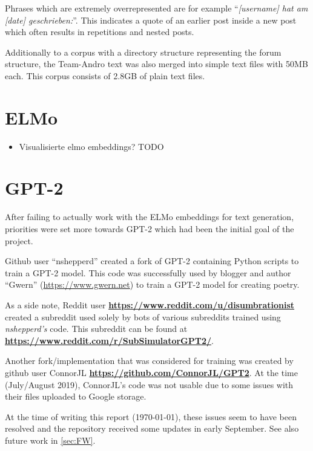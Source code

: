 \documentclass[sigconf,natbib=false]{acmart}
\newcommand{\burl}[1]{\textbf{\url{#1}}}
\begin{document}
Phrases which are extremely overrepresented are for example \enquote{\textit{[username] hat am [date] geschrieben:}}.
This indicates a quote of an earlier post inside a new post which often results in repetitions and nested posts.

Additionally to a corpus with a directory structure representing the forum structure, the Team-Andro text was also merged into simple text files with 50MB each. This corpus consists of 2.8GB of plain text files.



\section{ELMo}
\cite{Peters:2018}

\begin{itemize}
	\item Visualisierte elmo embeddings? TODO
\end{itemize}

\section{GPT-2}
After failing to actually work with the ELMo embeddings for text generation, priorities were set more towards GPT-2 which had been the initial goal of the project.



\cite{radford2019language}

Github user \enquote{nshepperd} created a fork of GPT-2 containing Python scripts to train a GPT-2 model. This code was successfully used by blogger and author \enquote{Gwern} (\url{https://www.gwern.net}) to train a GPT-2 model for creating poetry.

As a side note, Reddit user \burl{https://www.reddit.com/u/disumbrationist} created a subreddit used solely by bots of various subreddits trained using \textit{nshepperd's} code. This subreddit can be found at \burl{https://www.reddit.com/r/SubSimulatorGPT2/}.

Another fork/implementation that was considered for training was created by github user ConnorJL \burl{https://github.com/ConnorJL/GPT2}. At the time (July/August 2019), ConnorJL's code was not usable due to some issues with their files uploaded to Google storage.

At the time of writing this report (\today), these issues seem to have been resolved and the repository received some updates in early September. See  also future work in \cref{sec:FW}.
\end{document}
